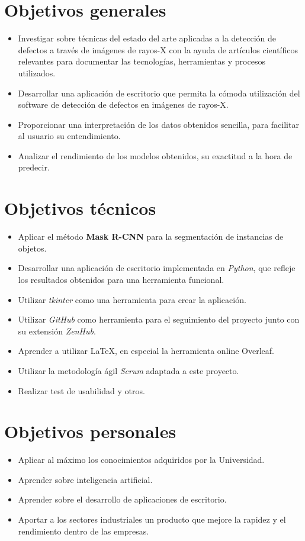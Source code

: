 
\section{Objetivos generales}

\begin{itemize}
	\item Investigar sobre técnicas del estado del arte aplicadas a la detección de defectos a través de imágenes de rayos-X con la ayuda de artículos científicos relevantes para documentar las tecnologías, herramientas y procesos utilizados.
	\item Desarrollar una aplicación de escritorio que permita la cómoda utilización del software de detección de defectos en imágenes de rayos-X.
	\item Proporcionar una interpretación de los datos obtenidos sencilla, para facilitar al usuario su entendimiento.
	\item Analizar el rendimiento de los modelos obtenidos, su exactitud a la hora de predecir.
\end{itemize}

\section{Objetivos técnicos}

\begin{itemize}
    \item Aplicar el método \textbf{Mask R-CNN} para la segmentación de instancias de objetos.
	\item Desarrollar una aplicación de escritorio implementada en \textit{Python}, que refleje los resultados obtenidos para una herramienta funcional.
	\item Utilizar \textit{tkinter} como una herramienta para crear la aplicación.
	\item Utilizar \textit{GitHub} como herramienta para el seguimiento del proyecto junto con su extensión \textit{ZenHub}.
	\item Aprender a utilizar \LaTeX{}, en especial la herramienta online Overleaf.
	\item Utilizar la metodología ágil \textit{Scrum} adaptada a este proyecto.
	\item Realizar test de usabilidad y otros.
\end{itemize}

\section{Objetivos personales}

\begin{itemize}
    \item Aplicar al máximo los conocimientos adquiridos por la Universidad.
    \item Aprender sobre inteligencia artificial.
    \item Aprender sobre el desarrollo de aplicaciones de escritorio.
    \item Aportar a los sectores industriales un producto que mejore la rapidez y el rendimiento dentro de las empresas.
\end{itemize}
